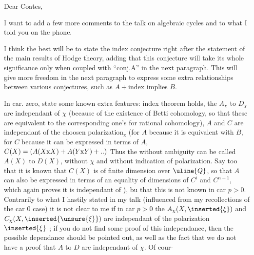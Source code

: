 Dear Coates,

I want to add a few more comments to the talk on algebraic cycles and to what I told you on the phone.

I think the best will be to state the index conjecture right after the statement of the main results of Hodge theory, adding that this conjecture will take its whole significance only when coupled with ``conj.A'' in the next paragraph. This will give more freedom in the next paragraph to express some extra relationships between various conjectures, such as $A+\text{index}$ implies $B$.

In car. zero, state some known extra features: index theorem holds, the  $A_{\chi}$ to $D_{\chi}$ are independant of $\chi$ (because of the existence of Betti cohomology, so that these  are equivalent to the corresponding one's for rational cohomology),  $A$ and $C$ are independant of the choosen polarization$_{\mathrm{x}}$ (for $A$ because it is equivalent with $B$, for $C$ because it can be expressed in terms of $A$, $C(X)=(A(X\mathrm{x}X)+A(Y\mathrm{x}Y)+\mathinner{..})$ Thus the  without ambiguity can be called $A(X)$ to $D(X)$, without  $\chi$ and without indication of polarization. Say too that it is known that $C(X)$ is of finite dimension over $\uline{Q}$, \inserted{(}so that $A$ can also be expressed in terms of an equality of dimensions of $C^i$ and $C^{n-1}$\deleted{)}, which again proves it is independant of \hspace{1em}), bu that this is not known in car $p>0$. Contrarily to what I hastily stated in my talk (influenced from my recollections of the car $0$ case) it is not clear to me if in car $p>0$ the   $A_{\chi}(X,\inserted{\xi})$ and $C_{\chi}(X,\inserted{\unsure{\xi}})$ are independant of the polarization $\inserted{\xi}$ ; if you do not find some proof of this independance, then the possible dependance should be pointed out, as well as the fact that  we do not have a proof that $A$ to $D$ are independant of $\chi$. Of cour-
